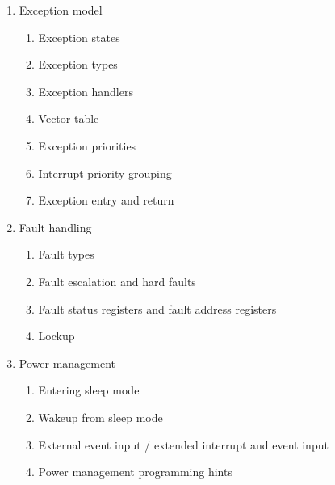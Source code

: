 \documentclass{article}
\begin{document}
\begin{enumerate}
\begin{enumerate}
\begin{enumerate}
            \item Behavior of memory accesses 
            \item Software ordering of memory accesses 
            \item Bit-banding 
            \item Memory endianness 
            \item Synchronization primitives 
            \item Programming hints for the synchronization primitives 
        \end{enumerate}
        \item Exception model 
        \begin{enumerate}
            \item Exception states 
            \item Exception types 
            \item Exception handlers 
            \item Vector table 
            \item Exception priorities 
            \item Interrupt priority grouping 
            \item Exception entry and return 
        \end{enumerate}
        \item Fault handling 
        \begin{enumerate}
            \item Fault types 
            \item Fault escalation and hard faults 
            \item Fault status registers and fault address registers 
            \item Lockup 
        \end{enumerate}
        \item Power management 
        \begin{enumerate}
            \item Entering sleep mode 
            \item Wakeup from sleep mode 
            \item External event input / extended interrupt and event input 
            \item Power management programming hints 

\end{enumerate}
\end{enumerate}
\end{enumerate}
\end{document}
